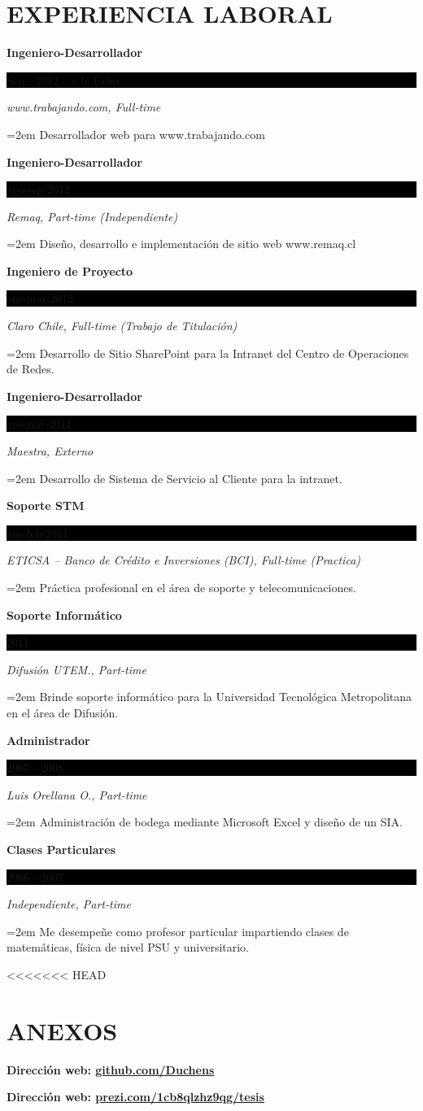 \documentclass[paper=a4,fontsize=11pt]{scrartcl}	 			%
\newcommand{\sepspace}{\vspace*{1em}}			%
\newcommand{\NewPart}[1]{\section*{\uppercase{#1}}}
\newcommand{\EducationEntry}[4]{
		\noindent \textbf{#1} \hfill 					%
		\colorbox{Black}{%
			\parbox{6em}{%
			\hfill\color{White}#2}} \par				%
		\noindent \textit{#3} \par					%
		\noindent\hangindent=2em\hangafter=0 \small #4 	%
		\normalsize \par}
\begin{document}
 
\NewPart{Experiencia Laboral}{}

\EducationEntry{Ingeniero-Desarrollador}{Sep - 2012 -- a la fecha}{www.trabajando.com,  Full-time}{Desarrollador web para  www.trabajando.com}

\sepspace

\EducationEntry{Ingeniero-Desarrollador}{ago-sep-2012}{Remaq,  Part-time (Independiente)}{Diseño, desarrollo e implementación de sitio web www.remaq.cl}

\sepspace

\EducationEntry{Ingeniero de Proyecto}{ene-mar-2012}{Claro Chile,  Full-time (Trabajo de Titulación)}{Desarrollo de Sitio SharePoint para la Intranet del Centro de Operaciones de Redes.}

\sepspace

\EducationEntry{Ingeniero-Desarrollador}{ago-nov-2011}{Maestra, Externo}{Desarrollo de Sistema de Servicio al Cliente para la intranet.}

\sepspace

\EducationEntry{Soporte STM}{ene-feb-2011}{ETICSA – Banco de Crédito e Inversiones (BCI), Full-time (Practica)}{Práctica profesional en el área de soporte y telecomunicaciones.}

 
\sepspace

\EducationEntry{Soporte Informático}{2011}{Difusión UTEM., Part-time}{Brinde soporte informático para la Universidad Tecnológica Metropolitana en el área de Difusión.}

\sepspace

\EducationEntry{Administrador}{2007 - 2008}{Luis Orellana O., Part-time}{Administración de bodega mediante Microsoft Excel y diseño de un SIA.}

\sepspace

\EducationEntry{Clases Particulares}{2006 - 2007}{Independiente, Part-time}{Me desempeñe como profesor particular impartiendo  clases de matemáticas, física de nivel PSU y universitario. }


<<<<<<< HEAD
\NewPart{Anexos}{}
\textbf{Dirección web: \hspace{0.6cm}   \url{github.com/Duchens}}

\sepspace

\textbf{Dirección web:  \hspace{0.6cm}  \url{prezi.com/1cb8qlzhz9qg/tesis}}
\end{document}
